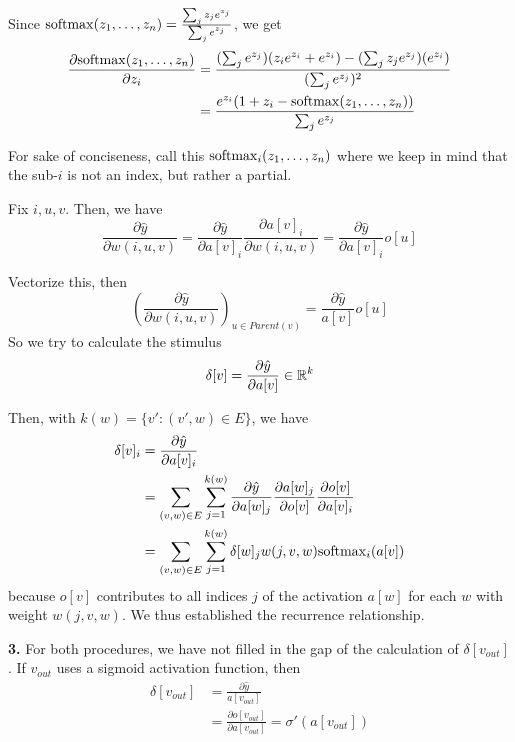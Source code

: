 \documentclass[a4paper, 10pt]{article}
\begin{document}
Since $\mathrm{softmax}(z_1, \ldots, z_n) = \frac{\sum_{j} z_j e^{z_j}}{\sum_{j} e^{z_j}}$, we get \begin{align*}
    \frac{\partial \mathrm{softmax}(z_1, \ldots, z_n)}{\partial z_i} &=  \frac{(\sum_j e^{z_j}) (z_i e^{z_i} + e^{z_i}) - (\sum_j z_j e^{z_j})(e^{z_i})}{(\sum_j e^{z_j})^2} \\
    &= \frac{e^{z_i}(1 + z_i - \mathrm{softmax}(z_1, \ldots, z_n))}{\sum_j e^{z_j}}
\end{align*}

For sake of conciseness, call this $\mathrm{softmax}_i(z_1, \ldots, z_n)$ where we keep in mind that the sub-$i$ is not an index, but rather a partial.


Fix $i, u, v$. Then, we have \begin{equation*}
\frac{\partial \hat{y}}{\partial w(i, u, v)} = \frac{\partial \hat{y}}{\partial a[v]_i} \frac{\partial a[v]_i}{\partial w(i, u, v)} = \frac{\partial \hat{y}}{\partial a[v]_i} o[u]
\end{equation*} 

Vectorize this, then
\begin{equation*}
\left(\frac{\partial \hat{y}}{\partial w (i, u, v)}\right)_{u \in Parent(v)} = \frac{\partial \hat{y}}{a[v]} o[u]
\end{equation*}
So we try to calculate the stimulus
\begin{equation*}
\delta[v] = \frac{\partial \hat{y}}{\partial a[v]} \in \mathbb{R}^k
\end{equation*}

Then, with $k(w) = \{v': (v', w) \in E\}$, we have 
\begin{align*}
\delta[v]_i &= \frac{\partial \hat{y}}{\partial a[v]_i} \\
&= \sum_{(v, w) \in E} \sum_{j = 1}^{k(w)} \frac{\partial \hat{y}}{\partial a[w]_j} \frac{\partial a[w]_j}{\partial o[v]} \frac{\partial o[v]}{ \partial a[v]_i} \\
&= \sum_{(v, w) \in E} \sum_{j = 1}^{k(w)} \delta[w]_j w(j, v, w) \mathrm{softmax}_i(a[v])
\end{align*}
because $o[v]$ contributes to all indices $j$ of the activation $a[w]$ for each $w$ with weight $w(j, v, w)$. We thus established the recurrence relationship.

\textbf{3.} For both procedures, we have not filled in the gap of the calculation of $\delta[v_{out}]$. If $v_{out}$ uses a sigmoid activation function, then
\begin{align*}
    \delta[v_{out}] &= \frac{\partial \hat{y}}{a[v_{out}]}  \\
    &= \frac{\partial o[v_{out}]}{\partial a[v_{out}]} = \sigma'(a[v_{out}])
    \end{align*}
\end{document}
